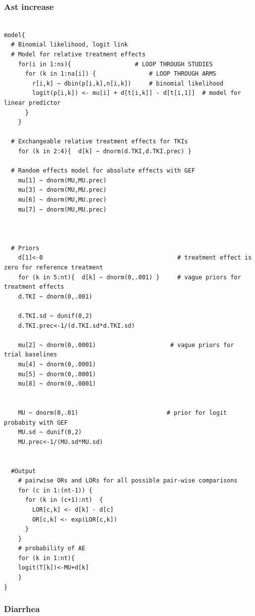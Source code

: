 \documentclass[11pt,final,fleqn]{article}\usepackage[]{graphicx}\usepackage[]{color}
\theoremstyle{plain}
\begin{document}
\begin{appendices}
\begin{verbatim}
\end{verbatim}

\subsubsection{Ast increase} 
\begin{verbatim} 

model{
  # Binomial likelihood, logit link
  # Model for relative treatment effects
    for(i in 1:ns){                  # LOOP THROUGH STUDIES
      for (k in 1:na[i]) {               # LOOP THROUGH ARMS
        r[i,k] ~ dbin(p[i,k],n[i,k])     # binomial likelihood
        logit(p[i,k]) <- mu[i] + d[t[i,k]] - d[t[i,1]]  # model for linear predictor
      }
    }   
  
  # Exchangeable relative treatment effects for TKIs
    for (k in 2:4){  d[k] ~ dnorm(d.TKI,d.TKI.prec) }
  
  # Random effects model for absolute effects with GEF
    mu[1] ~ dnorm(MU,MU.prec) 
    mu[3] ~ dnorm(MU,MU.prec) 
    mu[6] ~ dnorm(MU,MU.prec) 
    mu[7] ~ dnorm(MU,MU.prec)
    
       
       
  # Priors
    d[1]<-0                                      # treatment effect is zero for reference treatment
    for (k in 5:nt){  d[k] ~ dnorm(0,.001) }     # vague priors for treatment effects
    d.TKI ~ dnorm(0,.001)
    
    d.TKI.sd ~ dunif(0,2) 
    d.TKI.prec<-1/(d.TKI.sd*d.TKI.sd)
    
    mu[2] ~ dnorm(0,.0001)                     # vague priors for trial baselines
    mu[4] ~ dnorm(0,.0001)                       
    mu[5] ~ dnorm(0,.0001)                       
    mu[8] ~ dnorm(0,.0001)                       
                     
      
    MU ~ dnorm(0,.01)                         # prior for logit probabity with GEF
    MU.sd ~ dunif(0,2) 
    MU.prec<-1/(MU.sd*MU.sd)
    
      
  #Output 
    # pairwise ORs and LORs for all possible pair-wise comparisons                                       
    for (c in 1:(nt-1)) {                        
      for (k in (c+1):nt)  { 
        LOR[c,k] <- d[k] - d[c]
        OR[c,k] <- exp(LOR[c,k])
      }  
    }
    # probability of AE
    for (k in 1:nt){ 
    logit(T[k])<-MU+d[k]
    }
}

\end{verbatim}

\subsubsection{Diarrhea} 
\begin{verbatim} 


\end{verbatim}
\end{appendices}
\end{document}
